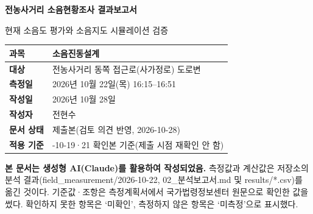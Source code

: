 \documentclass[10.5pt,a4paper]{article}
\renewcommand{\arraystretch}{1.25}
\newcommand{\notebox}[2][lab]{\par\noindent\colorbox{#1}{\parbox{\dimexpr\linewidth-2\fboxsep}{\small #2}}\par}
\begin{document}
\begin{titlepage}
\centering\vspace*{40mm}
{\sffamily\Huge\bfseries\color{navy} 전농사거리 소음현황조사 결과보고서\par}
\vspace{6mm}
{\sffamily\large 현재 소음도 평가와 소음지도 시뮬레이션 검증\par}
\vspace{18mm}
{\renewcommand{\arraystretch}{1.5}
\begin{tabular}{>{\raggedright\arraybackslash}p{38mm}>{\raggedright\arraybackslash}p{90mm}}
\toprule
\cellcolor{headfill}\textbf{\sffamily 과목} & 소음진동설계 \\ \midrule
\cellcolor{headfill}\textbf{\sffamily 대상} & 전농사거리 동쪽 접근로(사가정로) 도로변 \\ \midrule
\cellcolor{headfill}\textbf{\sffamily 측정일} & 2026년 10월 22일(목) 16:15--16:51 \\ \midrule
\cellcolor{headfill}\textbf{\sffamily 작성일} & 2026년 10월 28일 \\ \midrule
\cellcolor{headfill}\textbf{\sffamily 작성자} & 전현수 \\ \midrule
\cellcolor{headfill}\textbf{\sffamily 문서 상태} & 제출본(검토 의견 반영, 2026-10-28) \\ \midrule
\cellcolor{headfill}\textbf{\sffamily 적용 기준} & 2026-10-19·21 확인본 기준(제출 시점 재확인 안 함) \\
\bottomrule
\end{tabular}}
\vfill
\notebox{\textbf{본 문서는 생성형 AI(Claude)를 활용하여 작성되었음.} 측정값과 계산값은 저장소의 분석 결과(field\_measurement/2026-10-22, 02\_분석보고서.md 및 results/*.csv)를 옮긴 것이다. 기준값·조항은 측정계획서에서 국가법령정보센터 원문으로 확인한 값을 썼다. 확인하지 못한 항목은 `미확인', 측정하지 않은 항목은 `미측정'으로 표시했다.}
\end{titlepage}
\tableofcontents
\clearpage

\end{document}
